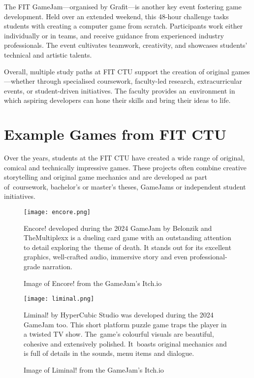 The FIT GameJam—organised by Grafit—is another key event fostering game development. Held over an extended weekend, this 48-hour challenge tasks students with creating a computer game from scratch. Participants work either individually or in teams, and receive guidance from experienced industry professionals. The event cultivates teamwork, creativity, and showcases students’ technical and artistic talents.
\cite{grafit_itch}

Overall, multiple study paths at FIT CTU support the creation of original games---whether through specialised coursework, faculty-led research, extracurricular events, or student-driven initiatives. The faculty provides an~environment in which aspiring developers can hone their skills and bring their ideas to life.

\section{Example Games from FIT CTU}\label{sec:example-games}
Over the years, students at the FIT CTU have created a wide range of original, comical and technically impressive games. These projects often combine creative storytelling and original game mechanics and are developed as part of~coursework, bachelor’s or master’s theses, GameJams or independent student initiatives.

\begin{figure}[H]
    \texttt{[image: encore.png]}
    \caption{Image of Encore! from the GameJam's Itch.io~\cite{itch_encore}}
    \label{fig:encore-picture}
    Encore! developed during the 2024 GameJam by Belonzik and TheMultiplexx is a dueling  card game with an outstanding attention to detail exploring the~theme of death. It stands out for its excellent graphics, well-crafted audio, immersive story and even professional-grade narration. \cite{itch_encore}
\end{figure}

\begin{figure}[H]
    \texttt{[image: liminal.png]}
    \caption{Image of Liminal! from the GameJam's Itch.io~\cite{itch_liminal}}
    \label{fig:liminal-picture}
    Liminal! by HyperCubic Studio was developed during the 2024 GameJam too. This short platform puzzle game traps the player in a twisted TV show. The~game’s colourful visuals are beautiful, cohesive and extensively polished. It~boasts original mechanics and is full of details in the sounds, menu items and dialogue. \cite{itch_liminal}
\end{figure}

